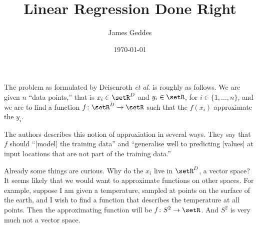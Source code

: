 \documentclass[11pt, a4paper]{article}
\author{James Geddes}
\date{\today}
\title{Linear Regression Done Right}
\begin{document}
The problem as formulated by Deisenroth \emph{et al.} is roughly as
follows. We are given \(n\) “data points,” that is \(x_i\in\setR^D\) and
\(y_i\in\setR\), for \(i\in\{1,\dotsc,n\}\), and we are to find a function
\(f\colon \setR^D \to \setR\) such that the \(f(x_i)\)
approximate the \(y_i\).

The authors describes this notion of approxiation in several
ways. They say that \(f\) should “[model] the training data” and
“generalise well to predicting [values] at input locations that are
not part of the training data.”

Already some things are curious. Why do the \(x_i\) live in
\(\setR^D\), a vector space? It seems likely that we would want to
approximate functions on other spaces. For example, suppose I am given
a temperature, sampled at points on the surface of the earth, and I
wish to find a function that describes the temperature at all
points. Then the approximating function will be \(f\colon
S^2\to\setR\). And \(S^2\) is very much not a vector space.
\end{document}

